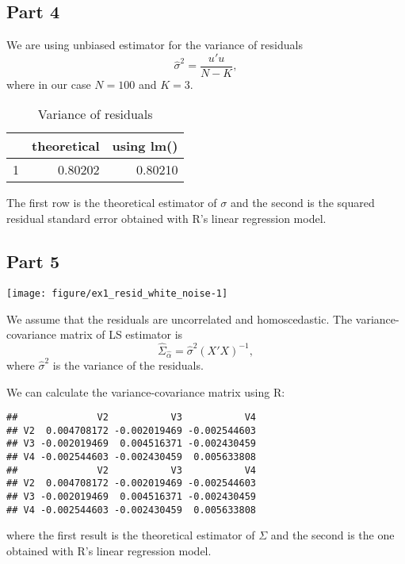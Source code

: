 \documentclass[12pt, a4paper]{article}\usepackage[]{graphicx}\usepackage[]{color}
\makeatletter
\def\maxwidth{ %
  \ifdim\Gin@nat@width>\linewidth
    \linewidth
  \else
    \Gin@nat@width
  \fi
}
\newenvironment{kframe}{%
 \def\at@end@of@kframe{}%
 \ifinner\ifhmode%
  \def\at@end@of@kframe{\end{minipage}}%
  \begin{minipage}{\columnwidth}%
 \fi\fi%
 \def\FrameCommand##1{\hskip\@totalleftmargin \hskip-\fboxsep
 \colorbox{shadecolor}{##1}\hskip-\fboxsep
     \hskip-\linewidth \hskip-\@totalleftmargin \hskip\columnwidth}%
 \MakeFramed {\advance\hsize-\width
   \@totalleftmargin\z@ \linewidth\hsize
   \@setminipage}}%
 {\par\unskip\endMakeFramed%
 \at@end@of@kframe}
\newenvironment{knitrout}{}{} %
\makeatother
\begin{document}
\subsection{Part 4}
We are using unbiased estimator for the variance of residuals
\[ \hat{\sigma}^2 = \frac{u'u}{N-K},\]
where in our case $N=100$ and $K=3$. 
\begin{table}[H]
\centering
\begin{tabular}{rrr}
  \hline
 & theoretical & using lm() \\ 
  \hline
1 & 0.80202 & 0.80210 \\ 
   \hline
\end{tabular}
\caption{Variance of residuals} 
\label{tab:table1}
\end{table}

The first row is the theoretical estimator of $\sigma$ and the second is the squared residual standard error obtained with R's linear regression model.



\subsection{Part 5}

\begin{knitrout}
\color{fgcolor}

{\centering \texttt{[image: figure/ex1\_resid\_white\_noise-1]} 

}



\end{knitrout}

We assume that the residuals are uncorrelated and homoscedastic. The variance-covariance matrix of LS estimator is
\[ \hat{\Sigma}_{\hat{\alpha}} = \hat{\sigma}^2 (X'X)^{-1}, \]
where $\hat{\sigma}^2$ is the variance of the residuals.

We can calculate the variance-covariance matrix using R:
\begin{knitrout}
\color{fgcolor}\begin{kframe}
\begin{verbatim}
##              V2           V3           V4
## V2  0.004708172 -0.002019469 -0.002544603
## V3 -0.002019469  0.004516371 -0.002430459
## V4 -0.002544603 -0.002430459  0.005633808
##              V2           V3           V4
## V2  0.004708172 -0.002019469 -0.002544603
## V3 -0.002019469  0.004516371 -0.002430459
## V4 -0.002544603 -0.002430459  0.005633808
\end{verbatim}
\end{kframe}
\end{knitrout}
where the first result is the theoretical estimator of $\Sigma$ and the second is the one obtained with R's linear regression model.
\end{document}
